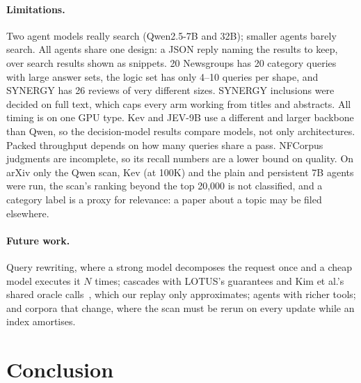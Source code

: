 \documentclass[11pt]{article}
\begin{document}
\paragraph{Limitations.}
Two agent models really search (Qwen2.5-7B and 32B); smaller agents barely
search. All agents share one design: a JSON reply naming the results to keep,
over search results shown as snippets. 20 Newsgroups has 20 category queries with large answer sets, the logic
set has only 4--10 queries per shape, and SYNERGY has 26 reviews of very
different sizes. SYNERGY inclusions were decided on full text, which caps every
arm working from titles and abstracts. All timing is on one GPU type. Kev and
JEV-9B use a different and larger backbone than Qwen, so the decision-model
results compare models, not only architectures. Packed throughput depends on
how many queries share a pass. NFCorpus judgments are incomplete, so its recall
numbers are a lower bound on quality. On arXiv only the Qwen scan, Kev (at
100K) and the plain and persistent 7B agents were run, the scan's ranking beyond the top 20,000 is not classified, and
a category label is a proxy for relevance: a paper about a topic may be filed
elsewhere.

\paragraph{Future work.}
Query rewriting, where a strong model decomposes the request once and a cheap
model executes it $N$ times; cascades with LOTUS's guarantees and
Kim et al.'s shared oracle calls~\cite{patel2024lotus, kim2026semfilter},
which our replay only approximates; agents with richer tools; and corpora that change, where the scan must be rerun on every update
while an index amortises.

\section{Conclusion}
\end{document}
